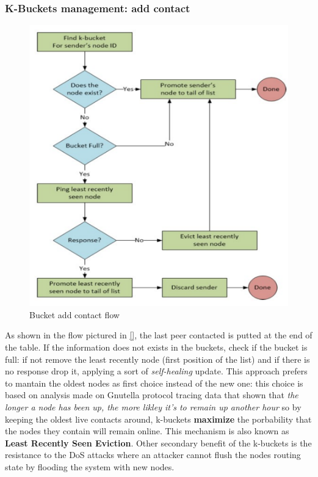 \documentclass[10pt,a4paper]{report}
\begin{document}
\subsubsection{K-Buckets management: add contact}\label{sec:k-buckets-management-add-contact}
\begin{figure}
	\centering
	\includegraphics[scale=0.60]{images/Pasted image 20230303151751.png}
	\caption{Bucket add contact flow}
	\label{bucket-flow}

\end{figure}

As shown in the flow pictured in \ref{}, the last peer contacted is putted at the end of the table. If the information does not exists in the buckets, check if the bucket is full: if not remove the least recently node (first position of the list) and if there is no response drop it, applying a sort of \textit{self-healing} update.
This approach prefers to mantain the oldest nodes as first choice instead of the new one: this choice is based on analysis made on Gnutella protocol tracing data that shown that \textit{the longer a node has been up, the more likley it's to remain up another hour} so by keeping the oldest live contacts around, k-buckets \textbf{maximize} the porbability that the nodes they contain will remain online. This mechanism is also known as \textbf{Least Recently Seen Eviction}.
Other secondary benefit of the k-buckets is the resistance to the DoS attacks where an attacker cannot flush the nodes routing state by flooding the system with new nodes.
\end{document}
